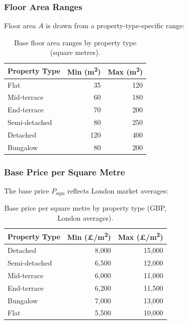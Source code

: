 \documentclass[11pt,a4paper]{article}
\begin{document}
\subsubsection{Floor Area Ranges}

Floor area $A$ is drawn from a property-type-specific range:

\begin{table}[H]
\centering
\caption{Base floor area ranges by property type (square metres).}
\label{tab:area_ranges}
\begin{tabular}{lrr}
\toprule
\textbf{Property Type} & \textbf{Min (m\textsuperscript{2})} & \textbf{Max (m\textsuperscript{2})} \\
\midrule
Flat            &  35 & 120 \\
Mid-terrace     &  60 & 180 \\
End-terrace     &  70 & 200 \\
Semi-detached   &  80 & 250 \\
Detached        & 120 & 400 \\
Bungalow        &  80 & 200 \\
\bottomrule
\end{tabular}
\end{table}

\subsubsection{Base Price per Square Metre}

The base price $P_{\mathrm{sqm}}$ reflects London market averages:

\begin{table}[H]
\centering
\caption{Base price per square metre by property type (GBP, London averages).}
\label{tab:price_per_sqm}
\begin{tabular}{lrr}
\toprule
\textbf{Property Type} & \textbf{Min (\pounds/m\textsuperscript{2})} & \textbf{Max (\pounds/m\textsuperscript{2})} \\
\midrule
Detached        & 8{,}000  & 15{,}000 \\
Semi-detached   & 6{,}500  & 12{,}000 \\
Mid-terrace     & 6{,}000  & 11{,}000 \\
End-terrace     & 6{,}200  & 11{,}500 \\
Bungalow        & 7{,}000  & 13{,}000 \\
Flat            & 5{,}500  & 10{,}000 \\
\bottomrule
\end{tabular}
\end{table}
\end{document}
